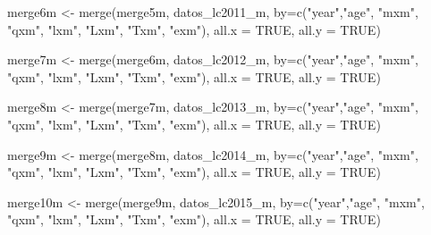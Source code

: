 \documentclass[
]{article}
\newenvironment{Shaded}{\begin{snugshade}}{\end{snugshade}}
\newcommand{\AttributeTok}[1]{\textcolor[rgb]{0.77,0.63,0.00}{#1}}
\newcommand{\ConstantTok}[1]{\textcolor[rgb]{0.00,0.00,0.00}{#1}}
\newcommand{\FunctionTok}[1]{\textcolor[rgb]{0.00,0.00,0.00}{#1}}
\newcommand{\NormalTok}[1]{#1}
\newcommand{\OtherTok}[1]{\textcolor[rgb]{0.56,0.35,0.01}{#1}}
\newcommand{\StringTok}[1]{\textcolor[rgb]{0.31,0.60,0.02}{#1}}
\begin{document}
\begin{Shaded}
\begin{Highlighting}[]
\NormalTok{merge6m }\OtherTok{\textless{}{-}} \FunctionTok{merge}\NormalTok{(merge5m, datos\_lc2011\_m, }\AttributeTok{by=}\FunctionTok{c}\NormalTok{(}\StringTok{"year"}\NormalTok{,}\StringTok{"age"}\NormalTok{, }\StringTok{"mxm"}\NormalTok{, }\StringTok{"qxm"}\NormalTok{, }\StringTok{"lxm"}\NormalTok{, }\StringTok{"Lxm"}\NormalTok{, }\StringTok{"Txm"}\NormalTok{, }\StringTok{"exm"}\NormalTok{), }\AttributeTok{all.x =} \ConstantTok{TRUE}\NormalTok{, }\AttributeTok{all.y =} \ConstantTok{TRUE}\NormalTok{)}

\NormalTok{merge7m }\OtherTok{\textless{}{-}} \FunctionTok{merge}\NormalTok{(merge6m, datos\_lc2012\_m, }\AttributeTok{by=}\FunctionTok{c}\NormalTok{(}\StringTok{"year"}\NormalTok{,}\StringTok{"age"}\NormalTok{, }\StringTok{"mxm"}\NormalTok{, }\StringTok{"qxm"}\NormalTok{, }\StringTok{"lxm"}\NormalTok{, }\StringTok{"Lxm"}\NormalTok{, }\StringTok{"Txm"}\NormalTok{, }\StringTok{"exm"}\NormalTok{), }\AttributeTok{all.x =} \ConstantTok{TRUE}\NormalTok{, }\AttributeTok{all.y =} \ConstantTok{TRUE}\NormalTok{)}

\NormalTok{merge8m }\OtherTok{\textless{}{-}} \FunctionTok{merge}\NormalTok{(merge7m, datos\_lc2013\_m, }\AttributeTok{by=}\FunctionTok{c}\NormalTok{(}\StringTok{"year"}\NormalTok{,}\StringTok{"age"}\NormalTok{, }\StringTok{"mxm"}\NormalTok{, }\StringTok{"qxm"}\NormalTok{, }\StringTok{"lxm"}\NormalTok{, }\StringTok{"Lxm"}\NormalTok{, }\StringTok{"Txm"}\NormalTok{, }\StringTok{"exm"}\NormalTok{), }\AttributeTok{all.x =} \ConstantTok{TRUE}\NormalTok{, }\AttributeTok{all.y =} \ConstantTok{TRUE}\NormalTok{)}

\NormalTok{merge9m }\OtherTok{\textless{}{-}} \FunctionTok{merge}\NormalTok{(merge8m, datos\_lc2014\_m, }\AttributeTok{by=}\FunctionTok{c}\NormalTok{(}\StringTok{"year"}\NormalTok{,}\StringTok{"age"}\NormalTok{, }\StringTok{"mxm"}\NormalTok{, }\StringTok{"qxm"}\NormalTok{, }\StringTok{"lxm"}\NormalTok{, }\StringTok{"Lxm"}\NormalTok{, }\StringTok{"Txm"}\NormalTok{, }\StringTok{"exm"}\NormalTok{), }\AttributeTok{all.x =} \ConstantTok{TRUE}\NormalTok{, }\AttributeTok{all.y =} \ConstantTok{TRUE}\NormalTok{)}

\NormalTok{merge10m }\OtherTok{\textless{}{-}} \FunctionTok{merge}\NormalTok{(merge9m, datos\_lc2015\_m, }\AttributeTok{by=}\FunctionTok{c}\NormalTok{(}\StringTok{"year"}\NormalTok{,}\StringTok{"age"}\NormalTok{, }\StringTok{"mxm"}\NormalTok{, }\StringTok{"qxm"}\NormalTok{, }\StringTok{"lxm"}\NormalTok{, }\StringTok{"Lxm"}\NormalTok{, }\StringTok{"Txm"}\NormalTok{, }\StringTok{"exm"}\NormalTok{), }\AttributeTok{all.x =} \ConstantTok{TRUE}\NormalTok{, }\AttributeTok{all.y =} \ConstantTok{TRUE}\NormalTok{)}


\end{Highlighting}
\end{Shaded}
\end{document}
